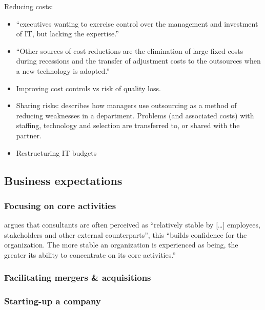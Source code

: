 \documentclass[12pt]{article}
\begin{document}
Reducing costs:

\begin{itemize}
\item
  ``executives wanting to exercise control over the management and
  investment of IT, but lacking the expertise.'' \citep[
  233]{sturdy1998}
\item
  ``Other sources of cost reductions are the elimination of large fixed
  costs during recessions and the transfer of adjustment costs to the
  outsources when a new technology is adopted.'' \citep{aubert1996}
\item
  Improving cost controls vs risk of quality loss. \citep[
  454]{ketler1993}
\item
  Sharing risks: \citet[454]{ketler1993} describes how managers use
  outsourcing as a method of reducing weaknesses in a department.
  Problems (and associated costs) with staffing, technology and
  selection are transferred to, or shared with the partner.
\item
  Restructuring IT budgets
\end{itemize}

\hypertarget{business-expectations}{%
\subsection{Business expectations}\label{business-expectations}}

\hypertarget{focusing-on-core-activities}{%
\subsubsection{Focusing on core
activities}\label{focusing-on-core-activities}}

\citet[272-273]{furusten2009} argues that consultants are often
perceived as ``relatively stable by {[}\ldots{]} employees, stakeholders
and other external counterparts'', this ``builds confidence for the
organization. The more stable an organization is experienced as being,
the greater its ability to concentrate on its core activities.''

\hypertarget{facilitating-mergers-acquisitions}{%
\subsubsection{Facilitating mergers \&
acquisitions}\label{facilitating-mergers-acquisitions}}

\hypertarget{starting-up-a-company}{%
\subsubsection{Starting-up a company}\label{starting-up-a-company}}
\end{document}
